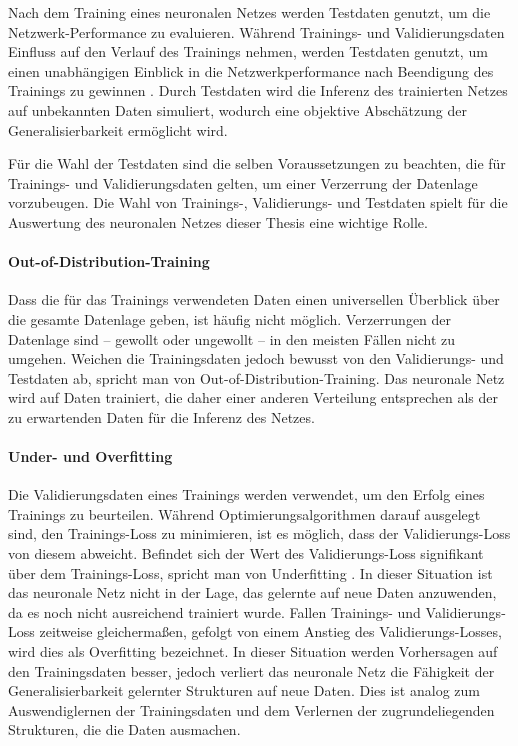 Nach dem Training eines neuronalen Netzes werden Testdaten genutzt, um die Netzwerk-Performance zu evaluieren. Während Trainings- und Validierungsdaten Einfluss auf den Verlauf des Trainings nehmen, werden Testdaten genutzt, um einen unabhängigen Einblick in die Netzwerkperformance nach Beendigung des Trainings zu gewinnen \cite{nn_terminology}. Durch Testdaten wird die Inferenz des trainierten Netzes auf unbekannten Daten simuliert, wodurch eine objektive Abschätzung der Generalisierbarkeit ermöglicht wird.

Für die Wahl der Testdaten sind die selben Voraussetzungen zu beachten, die für Trainings- und Validierungsdaten gelten, um einer Verzerrung der Datenlage vorzubeugen. Die Wahl von Trainings-, Validierungs- und Testdaten spielt für die Auswertung des neuronalen Netzes dieser Thesis eine wichtige Rolle.

\paragraph{Out-of-Distribution-Training}

Dass die für das Trainings verwendeten Daten einen universellen Überblick über die gesamte Datenlage geben, ist häufig nicht möglich. Verzerrungen der Datenlage sind -- gewollt oder ungewollt -- in den meisten Fällen nicht zu umgehen. Weichen die Trainingsdaten jedoch bewusst von den Validierungs- und Testdaten ab, spricht man von Out-of-Distribution-Training. Das neuronale Netz wird auf Daten trainiert, die daher einer anderen Verteilung entsprechen als der zu erwartenden Daten für die Inferenz des Netzes.

\paragraph{Under- und Overfitting}

Die Validierungsdaten eines Trainings werden verwendet, um den Erfolg eines Trainings zu beurteilen. Während Optimierungsalgorithmen darauf ausgelegt sind, den Trainings-Loss zu minimieren, ist es möglich, dass der Validierungs-Loss von diesem abweicht. Befindet sich der Wert des Validierungs-Loss signifikant über dem Trainings-Loss, spricht man von Underfitting \cite{nn_terminology}. In dieser Situation ist das neuronale Netz nicht in der Lage, das gelernte auf neue Daten anzuwenden, da es noch nicht ausreichend trainiert wurde. Fallen Trainings- und Validierungs-Loss zeitweise gleichermaßen, gefolgt von einem Anstieg des Validierungs-Losses, wird dies als Overfitting bezeichnet. In dieser Situation werden Vorhersagen auf den Trainingsdaten besser, jedoch verliert das neuronale Netz die Fähigkeit der Generalisierbarkeit gelernter Strukturen auf neue Daten. Dies ist analog zum Auswendiglernen der Trainingsdaten und dem Verlernen der zugrundeliegenden Strukturen, die die Daten ausmachen.

